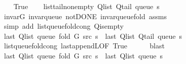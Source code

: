 \begin{isabellebody}
\ \ \isamarkupfalse%
\ True\isanewline
\ \ \isamarkupfalse%
\ list{\isacharunderscore}{\kern0pt}tail{\isacharunderscore}{\kern0pt}non{\isacharunderscore}{\kern0pt}empty{\isacharcolon}{\kern0pt}\ {\isachardoublequoteopen}Q{\isacharunderscore}{\kern0pt}list\ {\isacharparenleft}{\kern0pt}Q{\isacharunderscore}{\kern0pt}tail\ {\isacharparenleft}{\kern0pt}queue\ s{\isacharparenright}{\kern0pt}{\isacharparenright}{\kern0pt}\ {\isasymnoteq}\ {\isacharbrackleft}{\kern0pt}{\isacharbrackright}{\kern0pt}{\isachardoublequoteclose}\isanewline
\ \ \ \ \isamarkupfalse%
\ invar{\isacharunderscore}{\kern0pt}G\ invar{\isacharunderscore}{\kern0pt}queue\ not{\isacharunderscore}{\kern0pt}DONE\ invar{\isacharunderscore}{\kern0pt}queue{\isacharunderscore}{\kern0pt}fold{\isacharunderscore}{\kern0pt}{}\ assms\isanewline
\ \ \ \ \isamarkupfalse%
\ {\isacharparenleft}{\kern0pt}simp\ add{\isacharcolon}{\kern0pt}\ list{\isacharunderscore}{\kern0pt}queue{\isacharunderscore}{\kern0pt}fold{\isacharunderscore}{\kern0pt}cong\ Q{\isachardot}{\kern0pt}is{\isacharunderscore}{\kern0pt}empty{\isacharparenright}{\kern0pt}\isanewline
\isanewline
\ \ \isamarkupfalse%
\ {\isachardoublequoteopen}last\ {\isacharparenleft}{\kern0pt}Q{\isacharunderscore}{\kern0pt}list\ {\isacharparenleft}{\kern0pt}queue\ {\isacharparenleft}{\kern0pt}fold\ G\ src\ s{\isacharparenright}{\kern0pt}{\isacharparenright}{\kern0pt}{\isacharparenright}{\kern0pt}\ {\isacharequal}{\kern0pt}\ last\ {\isacharparenleft}{\kern0pt}Q{\isacharunderscore}{\kern0pt}list\ {\isacharparenleft}{\kern0pt}Q{\isacharunderscore}{\kern0pt}tail\ {\isacharparenleft}{\kern0pt}queue\ s{\isacharparenright}{\kern0pt}{\isacharparenright}{\kern0pt}{\isacharparenright}{\kern0pt}{\isachardoublequoteclose}\isanewline
\ \ \ \ \isamarkupfalse%
\ list{\isacharunderscore}{\kern0pt}queue{\isacharunderscore}{\kern0pt}fold{\isacharunderscore}{\kern0pt}cong\ last{\isacharunderscore}{\kern0pt}appendL{\isacharbrackleft}{\kern0pt}OF\ True{\isacharbrackright}{\kern0pt}\isanewline
\ \ \ \ \isamarkupfalse%
\ blast\isanewline
\ \ \isamarkupfalse%
\ {\isachardoublequoteopen}last\ {\isacharparenleft}{\kern0pt}Q{\isacharunderscore}{\kern0pt}list\ {\isacharparenleft}{\kern0pt}queue\ {\isacharparenleft}{\kern0pt}fold\ G\ src\ s{\isacharparenright}{\kern0pt}{\isacharparenright}{\kern0pt}{\isacharparenright}{\kern0pt}\ {\isacharequal}{\kern0pt}\ last\ {\isacharparenleft}{\kern0pt}Q{\isacharunderscore}{\kern0pt}list\ {\isacharparenleft}{\kern0pt}queue\ s{\isacharparenright}{\kern0pt}{\isacharparenright}{\kern0pt}{\isachardoublequoteclose}\isanewline

\end{isabellebody}
